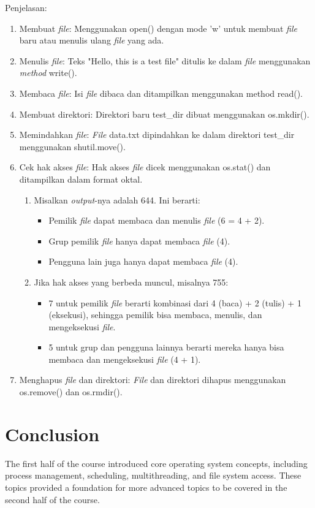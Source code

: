 \documentclass[12pt]{article}
\begin{document}
Penjelasan:
\begin{enumerate}
    \item Membuat \textit{file}: Menggunakan open() dengan mode 'w' untuk membuat \textit{file} baru atau menulis ulang \textit{file} yang ada.
    \item Menulis \textit{file}: Teks "Hello, this is a test file" ditulis ke dalam \textit{file} menggunakan \textit{method} write().
    \item Membaca \textit{file}: Isi \textit{file} dibaca dan ditampilkan menggunakan method read().
    \item Membuat direktori: Direktori baru test_dir dibuat menggunakan os.mkdir().
    \item Memindahkan \textit{file}: \textit{File} data.txt dipindahkan ke dalam direktori test_dir menggunakan shutil.move().
    \item Cek hak akses \textit{file}: Hak akses \textit{file} dicek menggunakan os.stat() dan ditampilkan dalam format oktal. 
    \begin{enumerate}
        \item Misalkan \textit{output}-nya adalah 644. Ini berarti:
        \begin{itemize}
            \item Pemilik \textit{file} dapat membaca dan menulis \textit{file} (6 = 4 + 2).
            \item Grup pemilik \textit{file} hanya dapat membaca \textit{file} (4).
            \item Pengguna lain juga hanya dapat membaca \textit{file} (4).
        \end{itemize}
        \item Jika hak akses yang berbeda muncul, misalnya 755:
        \begin{itemize}
            \item 7 untuk pemilik \textit{file} berarti kombinasi dari 4 (baca) + 2 (tulis) + 1 (eksekusi), sehingga pemilik bisa membaca, menulis, dan mengeksekusi \textit{file}.
            \item 5 untuk grup dan pengguna lainnya berarti mereka hanya bisa membaca dan mengeksekusi \textit{file} (4 + 1).
        \end{itemize}
    \end{enumerate}
    \item Menghapus \textit{file} dan direktori: \textit{File} dan direktori dihapus menggunakan os.remove() dan os.rmdir().
\end{enumerate}

\section{Conclusion}
The first half of the course introduced core operating system concepts, including process management, scheduling, multithreading, and file system access. These topics provided a foundation for more advanced topics to be covered in the second half of the course.
\end{document}
